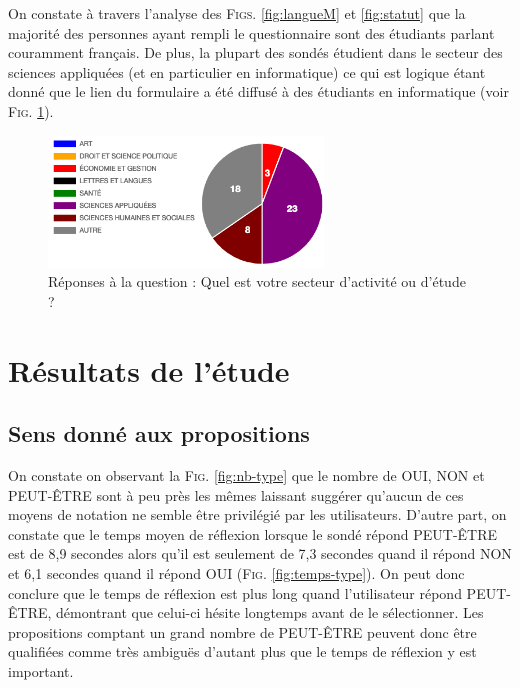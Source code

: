 \documentclass[11pt,letterpaper]{article}
\begin{document}
\newpage

On constate à travers l'analyse des \textsc{Figs. }\ref{fig:langueM} et \ref{fig:statut} que la majorité des personnes ayant rempli le questionnaire sont des étudiants parlant couramment français. De plus, la plupart des sondés étudient dans le secteur des sciences appliquées (et en particulier en informatique) ce qui est logique étant donné que le lien du formulaire a été diffusé à des étudiants en informatique (voir \textsc{Fig. }\ref{fig:secteur}).

\vspace{5px}

\begin{figure}[htbp]
\begin{center}
\includegraphics[width=0.65\textwidth]{figures/secteur.png}
\caption{Réponses à la question : \og Quel est votre secteur d'activité ou d'étude ?\fg{}}
\label{fig:secteur}
\end{center}
\end{figure}

\vspace{-15px}

\section{Résultats de l'étude}

\subsection{Sens donné aux propositions}

On constate on observant la \textsc{Fig. }\ref{fig:nb-type} que le nombre de OUI, NON et PEUT-ÊTRE sont à peu près les mêmes laissant suggérer qu'aucun de ces moyens de notation ne semble être privilégié par les utilisateurs. D'autre part, on constate que le temps moyen de réflexion lorsque le sondé répond PEUT-ÊTRE est de 8,9 secondes alors qu'il est seulement de 7,3 secondes quand il répond NON et 6,1 secondes quand il répond OUI (\textsc{Fig. }\ref{fig:temps-type}). On peut donc conclure que le temps de réflexion est plus long quand l'utilisateur répond PEUT-ÊTRE, démontrant que celui-ci hésite longtemps avant de le sélectionner. Les propositions comptant un grand nombre de PEUT-ÊTRE peuvent donc être qualifiées comme très ambiguës d'autant plus que le temps de réflexion y est important.
\end{document}
